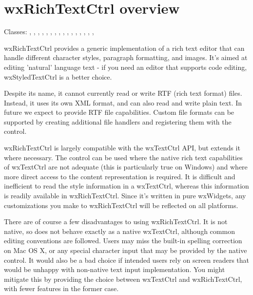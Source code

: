 \section{wxRichTextCtrl overview}\label{wxrichtextctrloverview}

Classes: , , 
, , 
, 
, 
, 
, 
, 
, 
, , 
, , 
, 
, 

wxRichTextCtrl provides a generic implementation of a rich text editor that can handle different character
styles, paragraph formatting, and images. It's aimed at editing 'natural' language text - if you need an editor that supports code editing,
wxStyledTextCtrl is a better choice.

Despite its name, it cannot currently read or write RTF (rich text format) files. Instead, it
uses its own XML format, and can also read and write plain text. In future we expect to provide
RTF file capabilities. Custom file formats can be supported by creating additional
file handlers and registering them with the control.

wxRichTextCtrl is largely compatible with the wxTextCtrl API, but extends it where necessary.
The control can be used where the native rich text capabilities of wxTextCtrl are not
adequate (this is particularly true on Windows) and where more direct access to
the content representation is required. It is difficult and inefficient to read
the style information in a wxTextCtrl, whereas this information is readily
available in wxRichTextCtrl. Since it's written in pure wxWidgets, any customizations
you make to wxRichTextCtrl will be reflected on all platforms.

There are of course a few disadvantages to using wxRichTextCtrl. It is not native,
so does not behave exactly as a native wxTextCtrl, although common editing conventions
are followed. Users may miss the built-in spelling correction on Mac OS X, or any
special character input that may be provided by the native control. It would also
be a bad choice if intended users rely on screen readers that would be unhappy
with non-native text input implementation. You might mitigate this by providing
the choice between wxTextCtrl and wxRichTextCtrl, with fewer features in the
former case.

